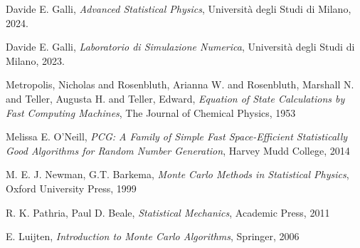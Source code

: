 \begin{thebibliography}{9}
     Davide E. Galli, \textit{Advanced Statistical Physics}, Università degli Studi di Milano, 2024.

     Davide E. Galli, \textit{Laboratorio di Simulazione Numerica}, Università degli Studi di Milano, 2023.

     Metropolis, Nicholas and Rosenbluth, Arianna W. and Rosenbluth, Marshall N. and Teller, Augusta H. and Teller, Edward,
    \textit{Equation of State Calculations by Fast Computing Machines}, The Journal of Chemical Physics, 1953

     Melissa E. O'Neill, \textit{PCG: A Family of Simple Fast Space-Efficient Statistically Good Algorithms for Random Number Generation}, 
    Harvey Mudd College, 2014

     M. E. J. Newman, G.T. Barkema, \textit{Monte Carlo Methods in Statistical Physics}, Oxford University Press, 1999
    
     R. K. Pathria, Paul D. Beale, \textit{Statistical Mechanics}, Academic Press, 2011

     E. Luijten, \textit{Introduction to Monte Carlo Algorithms}, Springer, 2006

\end{thebibliography}